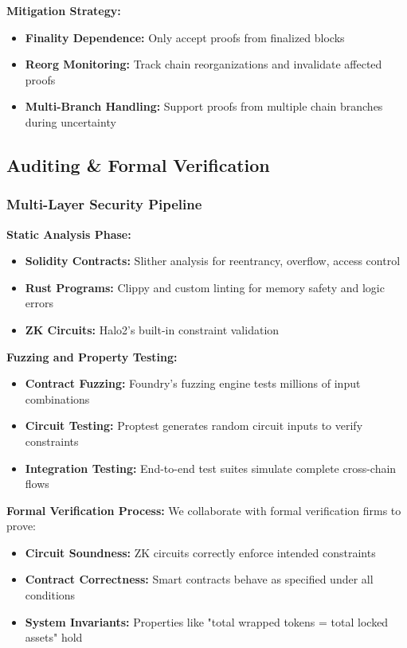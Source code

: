 \documentclass[11pt,a4paper]{article}
\begin{document}
\textbf{Mitigation Strategy:}
\begin{itemize}
    \item \textbf{Finality Dependence:} Only accept proofs from finalized blocks
    \item \textbf{Reorg Monitoring:} Track chain reorganizations and invalidate affected proofs
    \item \textbf{Multi-Branch Handling:} Support proofs from multiple chain branches during uncertainty
\end{itemize}

\subsection{Auditing \& Formal Verification}

\subsubsection{Multi-Layer Security Pipeline}

\textbf{Static Analysis Phase:}
\begin{itemize}
    \item \textbf{Solidity Contracts:} Slither analysis for reentrancy, overflow, access control
    \item \textbf{Rust Programs:} Clippy and custom linting for memory safety and logic errors
    \item \textbf{ZK Circuits:} Halo2's built-in constraint validation
\end{itemize}

\textbf{Fuzzing and Property Testing:}
\begin{itemize}
    \item \textbf{Contract Fuzzing:} Foundry's fuzzing engine tests millions of input combinations
    \item \textbf{Circuit Testing:} Proptest generates random circuit inputs to verify constraints
    \item \textbf{Integration Testing:} End-to-end test suites simulate complete cross-chain flows
\end{itemize}

\textbf{Formal Verification Process:}
We collaborate with formal verification firms to prove:
\begin{itemize}
    \item \textbf{Circuit Soundness:} ZK circuits correctly enforce intended constraints
    \item \textbf{Contract Correctness:} Smart contracts behave as specified under all conditions
    \item \textbf{System Invariants:} Properties like "total wrapped tokens = total locked assets" hold
\end{itemize}
\end{document}
